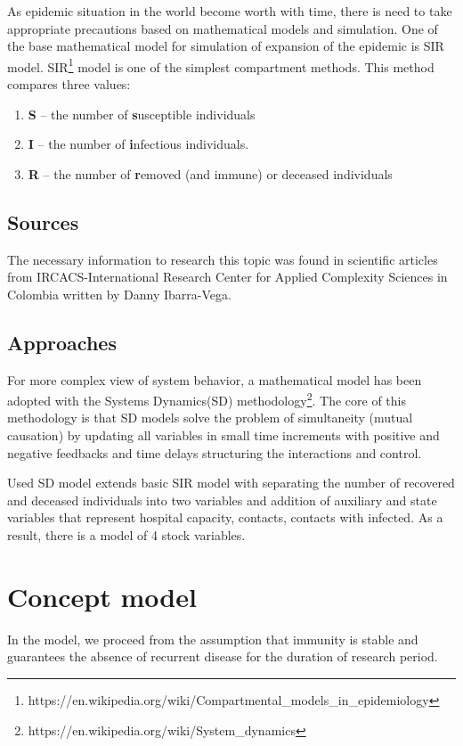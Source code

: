 \documentclass[12pt,a4paper,english]{article}
\begin{document}
    As epidemic situation in the world become worth with time, there is need to take appropriate precautions based on mathematical models and simulation. 
    One of the base mathematical model for simulation of expansion of the epidemic is SIR model. 
    SIR\footnote{https://en.wikipedia.org/wiki/Compartmental\_models\_in\_epidemiology} model is one of the simplest compartment methods.
    \newpage
    \noindent This method compares three values:
    \begin{enumerate}
        \item \textbf{S} -- the number of \textbf{s}usceptible individuals
        \item \textbf{I} -- the number of \textbf{i}nfectious individuals.
        \item \textbf{R} -- the number of \textbf{r}emoved (and immune) or deceased individuals
    \end{enumerate} 

    \subsection{Sources}
    The necessary information to research this topic was found in scientific articles from IRCACS-International Research Center for Applied Complexity Sciences in  Colombia written by Danny Ibarra-Vega\cite{math_article}.

    \subsection{Approaches}
    For more complex view of system behavior, a mathematical model has been adopted with the Systems Dynamics(SD) methodology\footnote{https://en.wikipedia.org/wiki/System\_dynamics}.
    The core of this methodology is that SD models solve the problem of simultaneity (mutual causation) by updating all variables in small time increments with positive and negative feedbacks and time delays structuring the interactions and control.
    
    Used SD model extends basic SIR model with separating the number of recovered and deceased individuals into two variables and addition of auxiliary and state variables that represent hospital capacity, contacts, contacts with infected. 
    As a result, there is a model of 4 stock variables.

    \newpage
    \section{Concept model} \label{conc_model}
    In the model, we proceed from the assumption that immunity is stable and guarantees the absence of recurrent disease for the duration of research period. 
    
\end{document}
